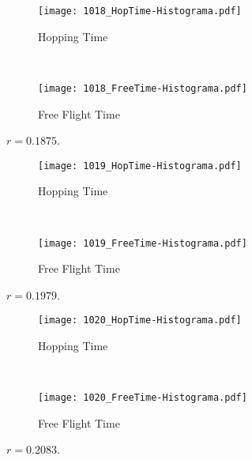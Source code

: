 \documentclass[a4paper,10pt]{article}
\begin{document}
\begin{figure}[h]
        \centering
        \begin{subfigure}[b]{0.45\textwidth}
                \centering
                \texttt{[image: 1018\_HopTime-Histograma.pdf]}
                \caption{Hopping Time}              
        \end{subfigure}%
        ~ %
        \begin{subfigure}[b]{0.45\textwidth}
                \centering
                \texttt{[image: 1018\_FreeTime-Histograma.pdf]}
                \caption{Free Flight Time}                
        \end{subfigure}       
        \caption{ $r=0.1875$. }
\end{figure}

\begin{figure}[h]
        \centering
        \begin{subfigure}[b]{0.45\textwidth}
                \centering
                \texttt{[image: 1019\_HopTime-Histograma.pdf]}
                \caption{Hopping Time}              
        \end{subfigure}%
        ~ %
        \begin{subfigure}[b]{0.45\textwidth}
                \centering
                \texttt{[image: 1019\_FreeTime-Histograma.pdf]}
                \caption{Free Flight Time}                
        \end{subfigure}       
        \caption{ $r=0.1979$. }
\end{figure}



\begin{figure}[h]
        \centering
        \begin{subfigure}[b]{0.45\textwidth}
                \centering
                \texttt{[image: 1020\_HopTime-Histograma.pdf]}
                \caption{Hopping Time}              
        \end{subfigure}%
        ~ %
        \begin{subfigure}[b]{0.45\textwidth}
                \centering
                \texttt{[image: 1020\_FreeTime-Histograma.pdf]}
                \caption{Free Flight Time}                
        \end{subfigure}       
        \caption{ $r=0.2083$. }
\end{figure}
\end{document}
